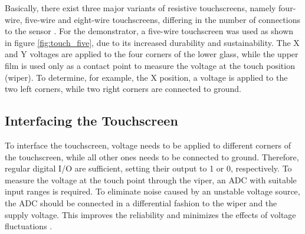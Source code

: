 Basically, there exist three major variants of resistive touchscreens, namely
four-wire, five-wire and eight-wire touchscreens, differing in the number of
connections to the sensor \citep{Wal12}. For the demonstrator, a five-wire
touchscreen was used as shown in figure \ref{fig:touch_five}, due to its
increased durability and sustainability. The X and Y voltages are applied to
the four corners of the lower glass, while the upper film is used only as a
contact point to measure the voltage at the touch position (wiper). To
determine, for example, the X position, a voltage is applied to the two left
corners, while two right corners are connected to ground.

\subsection{Interfacing the Touchscreen}
To interface the touchscreen, voltage needs to be applied to different corners
of the touchscreen, while all other ones needs to be connected to ground.
Therefore, regular digital I/O are sufficient, setting their output to 1 or 0,
respectively. To measure the voltage at the touch point through the viper, an
\ac{ADC} with suitable input ranges is required. To eliminate noise caused by
an unstable voltage source, the \ac{ADC} should be connected in a differential
fashion to the wiper and the supply voltage. This improves the reliability and
minimizes the effects of voltage fluctuations \citep{OOD00}.

